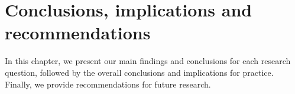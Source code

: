 \chapter{Conclusions, implications and recommendations}\label{ch6_title}

In this chapter, we present our main findings and conclusions for each research question, followed by the overall conclusions and implications for practice. Finally, we provide recommendations for future research.
